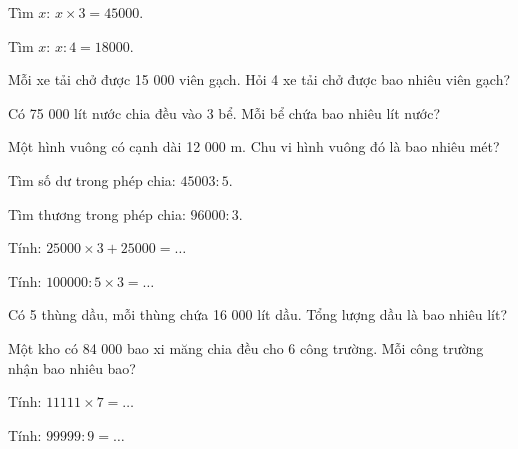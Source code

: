 \begin{ex}
Tìm $x$: $x \times 3 = 45000$.
\end{ex}

\begin{ex}
Tìm $x$: $x : 4 = 18000$.
\end{ex}

\begin{ex}
Mỗi xe tải chở được 15 000 viên gạch. Hỏi 4 xe tải chở được bao nhiêu viên gạch?
\end{ex}

\begin{ex}
Có 75 000 lít nước chia đều vào 3 bể. Mỗi bể chứa bao nhiêu lít nước?
\end{ex}

\begin{ex}
Một hình vuông có cạnh dài 12 000 m. Chu vi hình vuông đó là bao nhiêu mét?
\end{ex}

\begin{ex}
Tìm số dư trong phép chia: $45003 : 5$.
\end{ex}

\begin{ex}
Tìm thương trong phép chia: $96000 : 3$.
\end{ex}

\begin{ex}
Tính: $25000 \times 3 + 25000 = \dots$
\end{ex}

\begin{ex}
Tính: $100000 : 5 \times 3 = \dots$
\end{ex}

\begin{ex}
Có 5 thùng dầu, mỗi thùng chứa 16 000 lít dầu. Tổng lượng dầu là bao nhiêu lít?
\end{ex}

\begin{ex}
Một kho có 84 000 bao xi măng chia đều cho 6 công trường. Mỗi công trường nhận bao nhiêu bao?
\end{ex}

\begin{ex}
Tính: $11111 \times 7 = \dots$
\end{ex}

\begin{ex}
Tính: $99999 : 9 = \dots$
\end{ex}
